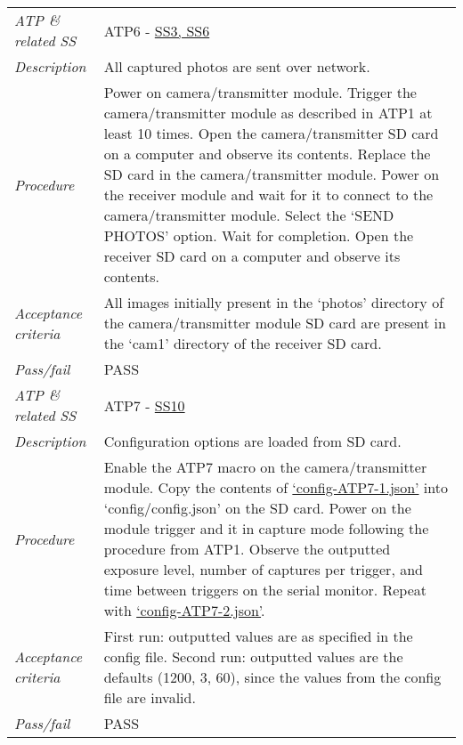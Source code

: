 \documentclass[class=report,11pt,crop=false]{standalone}
\begin{document}
\begin{table}[!ht]
\begin{scriptsize}
\begin{tabularx}{\textwidth}{|p{} X|}
        \textit{ATP \& related SS} & ATP6 - \hyperlink{tab:firmware-requirements}{SS3, SS6}\\
        \textit{Description} & All captured photos are sent over network. \\
        \textit{Procedure} & Power on camera/transmitter module. Trigger the camera/transmitter module as described in ATP1 at least 10 times. Open the camera/transmitter SD card on a computer and observe its contents. Replace the SD card in the camera/transmitter module. Power on the receiver module and wait for it to connect to the camera/transmitter module. Select the `SEND PHOTOS' option. Wait for completion. Open the receiver SD card on a computer and observe its contents.\\
        \textit{Acceptance criteria} & All images initially present in the `photos' directory of the camera/transmitter module SD card are present in the `cam1' directory of the receiver SD card.\\ 
        \textit{Pass/fail} & PASS \\ \hline
        \textit{ATP \& related SS} & ATP7 - \hyperlink{tab:firmware-requirements}{SS10} \\
        \textit{Description} & Configuration options are loaded from SD card.\\
        \textit{Procedure} & Enable the ATP7 macro on the camera/transmitter module. Copy the contents of \href{https://github.com/rothdu/EEE4113F-Group13-2024/blob/main/firmware/json-samples/config-ATP7-1.json}{`config-ATP7-1.json'} into `config/config.json' on the SD card. Power on the module trigger and it in capture mode following the procedure from ATP1. Observe the outputted exposure level, number of captures per trigger, and time between triggers on the serial monitor. Repeat with \href{https://github.com/rothdu/EEE4113F-Group13-2024/blob/main/firmware/json-samples/config-ATP7-2.json}{`config-ATP7-2.json'}. \\
        \textit{Acceptance criteria} & First run: outputted values are as specified in the config file. Second run: outputted values are the defaults (1200, 3, 60), since the values from the config file are invalid.\\ 
        \textit{Pass/fail} & PASS\\ \hline


\end{tabularx}
\end{scriptsize}
\end{table}
\end{document}
